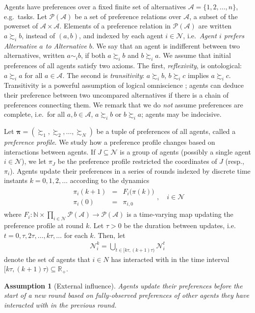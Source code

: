 \documentclass[conference]{ieeeconf}
\newcommand{\R}{\mathbb{R}}
\newcommand{\N}{\mathcal{N}}
\newcommand{\A}{\mathcal{A}}
\renewcommand{\P}{\mathcal{P}}
\newcommand{\prefers}{\succsim}
\newcommand{\indif}{\sim}
\newtheorem{assumption}{Assumption}
\begin{document}
Agents have preferences over a fixed finite set of alternatives $\A = \{1,2,\dots, n\}$, e.g.~tasks.  Let $\P(\A)$ be a set of preference relations over $\A$, a subset of the powerset of $\A \times \A$. Elements of a preference relation in $\P(\A)$ are written $a \prefers_i b$, instead of $(a,b)$, and indexed by each agent $i \in \N$, i.e.~\emph{Agent $i$ prefers Alternative $a$ to Alternative $b$}. We say that an agent is indifferent between two alternatives, written $a \indif_i b$, if both $a \prefers_i b$ and $b \prefers_i a$. We assume that initial preferences of all agents satisfy two axioms. The first, \emph{reflexivity}, is ontological: $a \prefers_i a$ for all $a \in \A$. The second is \emph{transitivity}: $a \prefers_i b$, $b \prefers_i c$ implies $a \prefers_i c$. Transitivity is a powerful assumption of logical omniscience \cite{fagin}; agents can deduce their preference between two uncompared alternatives if there is a chain of preferences connecting them. We remark that we do \emph{not} assume preferences are complete, i.e.~for all $a,b \in \A$, $a \prefers_i b$ or $b \prefers_i a$; agents may be indecisive.

Let $\boldsymbol{\pi} = \left( \prefers_1, \prefers_2, \dots, \prefers_N \right)$ be a tuple of preferences of all agents, called a \emph{preference profile}. We study how a preference profile changes based on interactions between agents. If $J \subseteq \N$ is a group of agents (possibly a single agent $i \in \N$), we let $\pi_{J}$ be the preference profile restricted the coordinates of $J$ (resp.,~$\pi_i$). Agents update their preferences in a series of rounds indexed by discrete time instants $k=0,1,2,\dots$ according to the dynamics
\begin{align}
    \begin{aligned}
        \pi_i(k+1) &=& F_i \bigl( \pi(k) \bigr)  \\
        \pi_i(0) &=& \pi_{i,0}
    \end{aligned}, \quad i \in \N
    \label{eq:pi-dynamics}
\end{align}
where $F_i: \mathbb{N} \times \prod_{i \in \N} \P(\A) \to \P(\A)$ is a time-varying map updating the preference profile at round $k$. Let $\tau > 0$ be the duration between updates, i.e.~$t = 0, \tau, 2 \tau, \dots, k \tau, \dots$ for each $k$. Then, let
\begin{align*}
    \N_i^k = \bigcup_{t \in [k \tau, (k+1)\tau)} \N_i^t
\end{align*}
denote the set of agents that $i \in N$ has interacted with in the time interval $[k\tau , (k+1)\tau) \subseteq \R_{+}$.
\begin{assumption}[External influence]\label{ass:external}
    Agents update their preferences before the start of a new round based on fully-observed preferences of other agents they have interacted with in the previous round.
\end{assumption}
\end{document}
